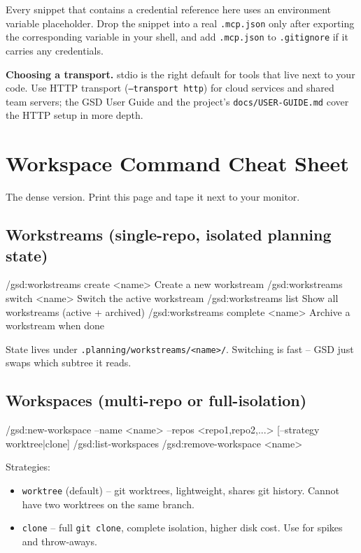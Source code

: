 \documentclass[11pt,letterpaper,openany]{book}
\begin{document}
\begin{gsdimportant}
Every snippet that contains a credential reference here uses an environment
variable placeholder. Drop the snippet into a real \texttt{.mcp.json} only
after exporting the corresponding variable in your shell, and add
\texttt{.mcp.json} to \texttt{.gitignore} if it carries any credentials.
\end{gsdimportant}

\textbf{Choosing a transport.} stdio is the right default for tools that
live next to your code. Use HTTP transport (\texttt{--transport http}) for
cloud services and shared team servers; the GSD User Guide and the project's
\texttt{docs/USER-GUIDE.md} cover the HTTP setup in more depth.

\chapter{Workspace Command Cheat Sheet}
\label{app:cheatsheet}

The dense version. Print this page and tape it next to your monitor.

\section*{Workstreams (single-repo, isolated planning state)}

\begin{gsdplain}
/gsd:workstreams create <name>      Create a new workstream
/gsd:workstreams switch <name>      Switch the active workstream
/gsd:workstreams list               Show all workstreams (active + archived)
/gsd:workstreams complete <name>    Archive a workstream when done
\end{gsdplain}

State lives under \texttt{.planning/workstreams/<name>/}. Switching is fast --
GSD just swaps which subtree it reads.

\section*{Workspaces (multi-repo or full-isolation)}

\begin{gsdplain}
/gsd:new-workspace --name <name> --repos <repo1,repo2,...>
                       [--strategy worktree|clone]
/gsd:list-workspaces
/gsd:remove-workspace <name>
\end{gsdplain}

Strategies:
\begin{itemize}[leftmargin=2em,itemsep=0.2em]
  \item \texttt{worktree} (default) -- git worktrees, lightweight, shares git
        history. Cannot have two worktrees on the same branch.
  \item \texttt{clone} -- full \texttt{git clone}, complete isolation, higher
        disk cost. Use for spikes and throw-aways.
\end{itemize}
\end{document}
